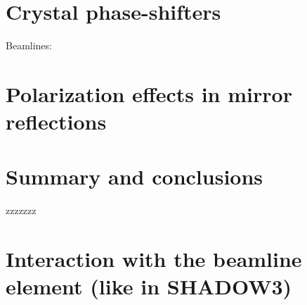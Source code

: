 \documentclass{iucr}
\begin{document}
\section{Crystal phase-shifters}\label{sec:phasesifters}

\cite{Bouchenoire2003}
\cite{Bouchenoire2012}
\cite{Detlefs2012}
\cite{Suzuki2023} 

Beamlines: \cite{Francoual2013} \cite{Freeland2002} \cite{Suzuki2014}

\section{Polarization effects in mirror reflections}\label{sec:phasesifters}

\cite{Nayar1997}

\section{Summary and conclusions}
\label{sec:summary}

zzzzzzz



\appendix

\section{Interaction with the beamline element (like in SHADOW3)}
\label{sec:S3}
\end{document}
